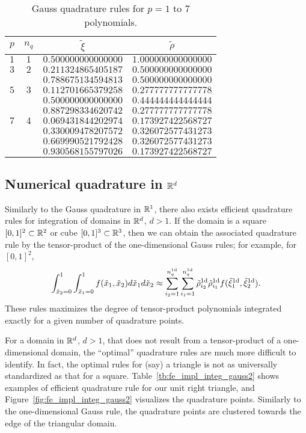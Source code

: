 \begin{table}
  \centering
  \begin{tabular}{cccc}
    $p$ & $n_q$ & $\tilde \xi$ & $\tilde \rho$ \\
    \hline
    $1$ & $1$ & $0.500000000000000$ & $1.000000000000000$ \\
    \hline
    $3$ & $2$ & $0.211324865405187$ & $0.500000000000000$ \\ 
    & & $0.788675134594813$ & $0.500000000000000$ \\
    \hline
    $5$ & $3$ & $0.112701665379258$ & $0.277777777777778$ \\ 
     & & $0.500000000000000$ & $0.444444444444444$ \\ 
     & & $0.887298334620742$ & $0.277777777777778$ \\
    \hline
    $7$ & $4$ & $0.069431844202974$ & $0.173927422568727$ \\ 
    & & $0.330009478207572$ & $0.326072577431273$ \\ 
    & & $0.669990521792428$ & $0.326072577431273$ \\ 
    & & $0.930568155797026$ & $0.173927422568727$ 
  \end{tabular}
  \caption{Gauss quadrature rules for $p = 1$ to $7$ polynomials. \label{tb:fe_impl_gauss}}
  \label{tb:integ_gauss}
\end{table}

\subsection{Numerical quadrature in $\mathbb{R}^d$}
\label{sec:fe_quad_nd}
Similarly to the Gauss quadrature in $\mathbb{R}^1$, there also exists efficient quadrature rules for integration of domains in $\mathbb{R}^d$, $d > 1$.  If the domain is a square $[0,1]^2 \subset \mathbb{R}^2$ or cube $[0,1]^3 \subset \mathbb{R}^3$, then we can obtain the associated quadrature rule by the tensor-product of the one-dimensional Gauss rules; for example, for $[0,1]^2$, 
\begin{equation*}
  \int_{\tilde x_2=0}^1 \int_{\tilde x_1=0}^1 f(\tilde x_1,\tilde x_2) d\tilde x_1 d\tilde x_2
  \approx \sum_{i_2 = 1}^{n_q^{\rm 1d}} \sum_{i_1 = 1}^{n_q^{\rm 1d}} \tilde \rho_{i_2}^{\rm 1d} \tilde \rho_{i_1}^{\rm 1d} f(\tilde \xi_1^{\rm 1d}, \tilde \xi_2^{\rm 1d}).
\end{equation*}
These rules maximizes the degree of tensor-product polynomials integrated exactly for a given number of quadrature points.

For a domain in $\mathbb{R}^d$, $d > 1$, that does not result from a tensor-product of a one-dimensional domain, the ``optimal'' quadrature rules are much more difficult to identify.  In fact, the optimal rules for (say) a triangle is not as universally standardized as that for a square. Table~\ref{tb:fe_impl_integ_gauss2} shows examples of efficient quadrature rule for our unit right triangle, and Figure~\ref{fig:fe_impl_integ_gauss2} visualizes the quadrature points.  Similarly to the one-dimensional Gauss rule, the quadrature points are clustered towards the edge of the triangular domain.


